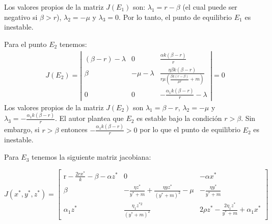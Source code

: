 \documentclass{wscpaperproc}
\theoremstyle{wsc}
\begin{document}
Los valores propios de la matriz $J(E_1)$ son: $\lambda_1 = r-\beta$ (el cual puede ser negativo si $\beta>r$), $\lambda_2= -\mu$ y $\lambda_3 = 0$. Por lo tanto, el punto de equilibrio $E_1$ es inestable.\par




Para el punto $E_2$ tenemos:
\begin{equation} \label{Equilibrium}
	\begin{aligned}
		 & J\left(E_2\right)=\left|\begin{array}{ccc}
			                           (\beta-r)-\lambda & 0            & \frac{\alpha k(\beta-r)}{r}                                                      \\
			                           \beta             & -\mu-\lambda & \frac{\eta \beta k(\beta-r)}{r \mu\left(\frac{\beta k(r-\beta)}{\mu r}+m\right)} \\
			                           0                 & 0            & -\frac{\alpha_1 k(\beta-r)}{r} - \lambda
		                           \end{array}\right|=0
	\end{aligned}
\end{equation}
Los valores propios de la matriz $J(E_2)$ son $\lambda_1 = \beta-r$, $\lambda_2=-\mu$ y $\lambda_3=-\frac{\alpha_1 k(\beta-r)}{r}$. El autor plantea que $E_2$ es estable bajo la condición $r>\beta$. Sin embargo, si $r>\beta$ entonces $-\frac{\alpha_1 k(\beta-r)}{r} > 0$ por lo que el punto de equilibrio $E_2$ es inestable. \par
Para $E_3$ tenemos la siguiente matriz jacobiana:

\begin{equation} \label{CharacteristicPolynomial}
	J\left(x^*, y^*, z^*\right)=\left[\begin{array}{ccc}
			\mathrm{r}-\frac{2 r x^*}{k}-\beta-\alpha z^* & 0                                                                   & -\alpha x^*                                     \\
			\beta                                         & -\frac{\eta z^*}{y^*+m}+\frac{\eta y z^*}{\left(y^*+m\right)^2}-\mu & -\frac{\eta y^*}{y^*+m}                         \\
			\alpha_1 z^*                                  & \frac{\eta_1 z^{* 2}}{\left(y^*+m\right)^2}                         & 2 \rho z^*-\frac{2 \eta_1 z^*}{y^*+m}+\alpha_1 x^*
		\end{array}\right]
\end{equation}
\end{document}
